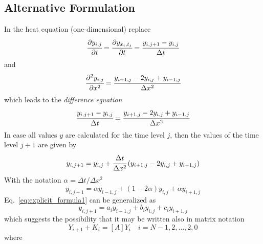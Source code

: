 \subsection{Alternative Formulation}
In the heat equation (one-dimensional) replace
\begin{equation}
\cfrac{\partial y_{i,j}}{\partial t} = \cfrac{\partial y_{x_i, t_j}}{\partial t} = \cfrac{y_{i,j+1}-y_{i,j}}{\Delta t}
\end{equation}
\noindent 
and
\begin{equation}
\cfrac{\partial^2 y_{i,j}}{\partial x^2}=\cfrac{y_{i+1,j} -2y_{i,j} + y_{i-1,j}}{\Delta x^2}
\end{equation}
\noindent
which leads to the \emph{difference equation}
\begin{equation}
\cfrac{y_{i,j+1}-y_{i,j}}{\Delta t} = \cfrac{y_{i+1,j}-2y_{i,j} + y_{i-1,j}}{\Delta x^2}
\end{equation}
\noindent
In case all values $y$ are calculated for the time level $j$, then the values of the time level $j + 1$ are given by
\begin{equation}
y_{i,j+1} = y_{i,j} + \cfrac{\Delta t}{\Delta x^2} \left(y_{i+1,j}-2y_{i,j} + y_{i-1,j}\right)
\end{equation}
With the notation $\alpha = \Delta t/\Delta x^2$
\begin{equation}
y_{i,j+1} = \alpha y_{i-1,j} + (1-2\alpha)y_{i,j} + \alpha y_{i+1,j} 
\label{eq:explicit_formula1}
\end{equation}
Eq.~\ref{eq:explicit_formula1} can be generalized as
\begin{equation}
y_{i,j+1} = a_i y_{i-1,j} + b_i y_{i,j} + c_i y_{i+1,j} 
\label{eq:explicit_formula2}
\end{equation}
\noindent
which suggests the possibility that it may be written also in matrix notation
\begin{equation}
Y_{i+1} + K_i = [A]Y_i \quad i=N-1, 2,\ldots,2,0
\end{equation}
\noindent
where
